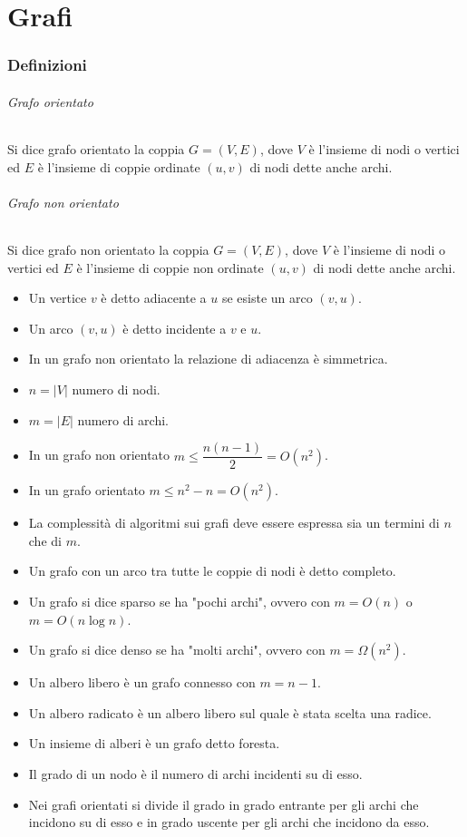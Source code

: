 \chapter{Grafi}
\subsection{Definizioni}
\subparagraph{Grafo orientato}
Si dice grafo orientato la coppia $G=(V, E)$, dove $V$ \`e l'insieme di nodi o vertici ed $E$ \`e l'insieme di coppie ordinate $(u, v)$ di nodi dette anche
archi. 
\subparagraph{Grafo non orientato}
Si dice grafo non orientato la coppia $G=(V, E)$, dove $V$ \`e l'insieme di nodi o vertici ed $E$ \`e l'insieme di coppie non ordinate $(u, v)$ di nodi 
dette anche archi. 
\begin{itemize}
\item Un vertice $v$ \`e detto adiacente a $u$ se esiste un arco $(v, u)$.
\item Un arco $(v, u)$ \`e detto incidente a $v$ e $u$.
\item In un grafo non orientato la relazione di adiacenza \`e simmetrica.
\item $n=|V|$ numero di nodi.
\item $m=|E|$ numero di archi.
\item In un grafo non orientato $m\le\dfrac{n(n-1)}{2}=O(n^2)$.
\item In un grafo orientato $m\le n^2-n=O(n^2)$.
\item La complessit\`a di algoritmi sui grafi deve essere espressa sia un termini di $n$ che di $m$. 
\item Un grafo con un arco tra tutte le coppie di nodi \`e detto completo.
\item Un grafo si dice sparso se ha "pochi archi", ovvero con $m=O(n)$ o $m=O(n\log n)$.
\item Un grafo si dice denso se ha "molti archi", ovvero con $m=\Omega(n^2)$.
\item Un albero libero \`e un grafo connesso con $m=n-1$.
\item Un albero radicato \`e un albero libero sul quale \`e stata scelta una radice. 
\item Un insieme di alberi \`e un grafo detto foresta.
\item Il grado di un nodo \`e il numero di archi incidenti su di esso.
\item Nei grafi orientati si divide il grado in grado entrante per gli archi che incidono su di esso e in grado uscente per gli archi che incidono da esso.

\end{itemize}
